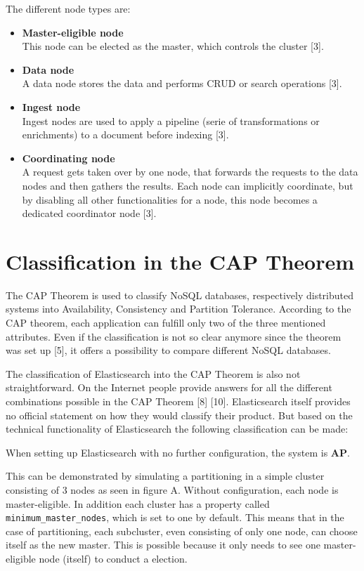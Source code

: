 The different node types are:
\begin{itemize}
    \item \textbf{Master-eligible node} \\ This node can be elected as the master, which controls the cluster [3].
    \item \textbf{Data node} \\ A data node stores the data and performs CRUD or search operations [3].
    \item \textbf{Ingest node} \\ Ingest nodes are used to apply a pipeline (serie of transformations or enrichments) to a document before indexing [3].
    \item \textbf{Coordinating node} \\ A request gets taken over by one node, that forwards the requests to the data nodes and then gathers the results. Each node can implicitly coordinate, but by disabling all other functionalities for a node, this node becomes a dedicated coordinator node [3].
\end{itemize}

\section{Classification in the CAP Theorem}
The CAP Theorem is used to classify NoSQL databases, respectively distributed systems into Availability, Consistency and Partition Tolerance. According to the CAP theorem, each application can fulfill only two of the three mentioned attributes. Even if the classification is not so clear anymore since the theorem was set up [5], it offers a possibility to compare different NoSQL databases.
 
The classification of Elasticsearch into the CAP Theorem is also not straightforward. On the Internet people provide answers for all the different combinations possible in the CAP Theorem [8] [10]. Elasticsearch itself provides no official statement on how they would classify their product. But based on the technical functionality of Elasticsearch the following classification can be made:

When setting up Elasticsearch with no further configuration, the system is \textbf{AP}. 

This can be demonstrated by simulating a partitioning in a simple cluster consisting of 3 nodes as seen in figure A.
Without configuration, each node is master-eligible.
In addition each cluster has a property called \texttt{minimum\_master\_nodes}, which is set to one by default.
This means that in the case of partitioning, each subcluster, even consisting of only one node, can choose itself as the new master.
This is possible because it only needs to see one master-eligible node (itself) to conduct a election.

